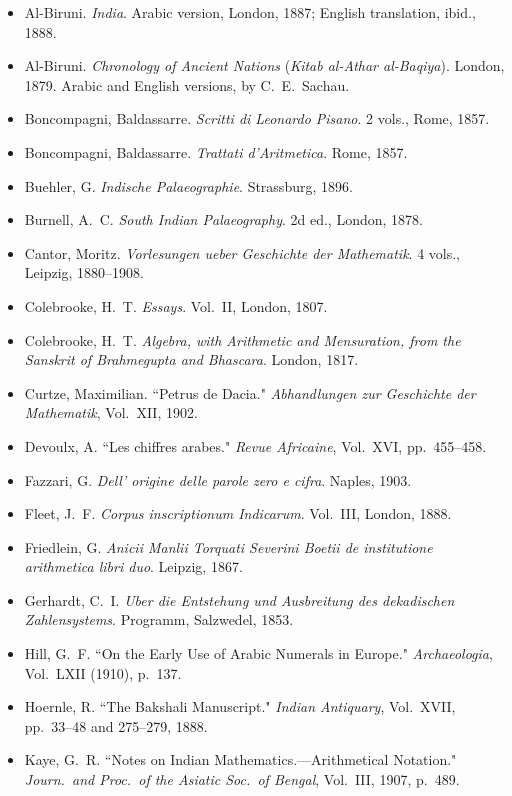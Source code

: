 \documentclass[11pt,a4paper]{article}
\begin{document}
\begin{footnotesize}
\begin{itemize}[leftmargin=2em,label={},itemsep=0.5ex]
\item Al-Biruni. \textit{India}. Arabic version, London, 1887; English translation, ibid., 1888.
\item Al-Biruni. \textit{Chronology of Ancient Nations} (\textit{Kitab al-Athar al-Baqiya}). London, 1879. Arabic and English versions, by C.~E.~Sachau.
\item Boncompagni, Baldassarre. \textit{Scritti di Leonardo Pisano}. 2 vols., Rome, 1857.
\item Boncompagni, Baldassarre. \textit{Trattati d'Aritmetica}. Rome, 1857.
\item Buehler, G. \textit{Indische Palaeographie}. Strassburg, 1896.
\item Burnell, A.~C. \textit{South Indian Palaeography}. 2d ed., London, 1878.
\item Cantor, Moritz. \textit{Vorlesungen ueber Geschichte der Mathematik}. 4 vols., Leipzig, 1880--1908.
\item Colebrooke, H.~T. \textit{Essays}. Vol.~II, London, 1807.
\item Colebrooke, H.~T. \textit{Algebra, with Arithmetic and Mensuration, from the Sanskrit of Brahmegupta and Bhascara}. London, 1817.
\item Curtze, Maximilian. ``Petrus de Dacia." \textit{Abhandlungen zur Geschichte der Mathematik}, Vol.~XII, 1902.
\item Devoulx, A. ``Les chiffres arabes." \textit{Revue Africaine}, Vol.~XVI, pp.~455--458.
\item Fazzari, G. \textit{Dell' origine delle parole zero e cifra}. Naples, 1903.
\item Fleet, J.~F. \textit{Corpus inscriptionum Indicarum}. Vol.~III, London, 1888.
\item Friedlein, G. \textit{Anicii Manlii Torquati Severini Boetii de institutione arithmetica libri duo}. Leipzig, 1867.
\item Gerhardt, C.~I. \textit{Uber die Entstehung und Ausbreitung des dekadischen Zahlensystems}. Programm, Salzwedel, 1853.
\item Hill, G.~F. ``On the Early Use of Arabic Numerals in Europe." \textit{Archaeologia}, Vol.~LXII (1910), p.~137.
\item Hoernle, R. ``The Bakshali Manuscript." \textit{Indian Antiquary}, Vol.~XVII, pp.~33--48 and 275--279, 1888.
\item Kaye, G.~R. ``Notes on Indian Mathematics.---Arithmetical Notation." \textit{Journ.\ and Proc.\ of the Asiatic Soc.\ of Bengal}, Vol.~III, 1907, p.~489.

\end{itemize}
\end{footnotesize}
\end{document}
